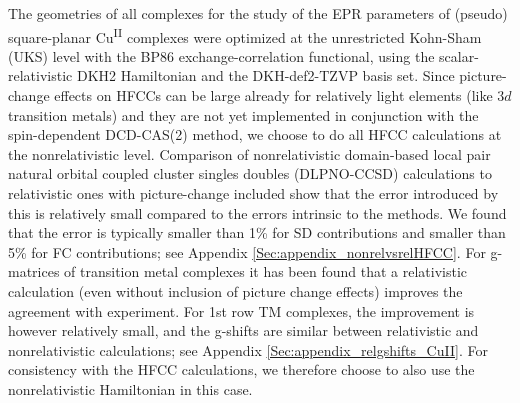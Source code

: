The geometries of all complexes for the study of the EPR parameters of (pseudo) square-planar Cu\textsuperscript{II} complexes were optimized at the unrestricted Kohn-Sham (UKS) level with the BP86 exchange-correlation functional, using the scalar-relativistic DKH2 Hamiltonian and the DKH-def2-TZVP basis set.
Since picture-change effects on HFCCs can be large already for relatively light elements (like $3d$ transition metals)\cite{SandhKN_2013_104102} and they are not yet implemented in conjunction with the spin-dependent DCD-CAS(2) method, we choose to do all HFCC calculations at the nonrelativistic level. Comparison of nonrelativistic domain-based local pair natural orbital coupled cluster singles doubles (DLPNO-CCSD)\cite{RipliPBVN_2016_24109, SaitoBRVN_2017_164105} calculations to relativistic ones with picture-change included show that the error introduced by this is relatively small compared to the errors intrinsic to the methods. We found that the error is typically smaller than 1\% for SD contributions and smaller than 5\% for FC contributions; see Appendix \ref{Sec:appendix_nonrelvsrelHFCC}. For g-matrices of transition metal complexes it has been found that a relativistic calculation (even without inclusion of picture change effects) improves the agreement with experiment.\cite{SandhN_2012_94102} For 1st row TM complexes, the improvement is however relatively small, and the g-shifts are similar between relativistic and nonrelativistic calculations; see Appendix \ref{Sec:appendix_relgshifts_CuII}. For consistency with the HFCC calculations, we therefore choose to also use the nonrelativistic Hamiltonian in this case.

